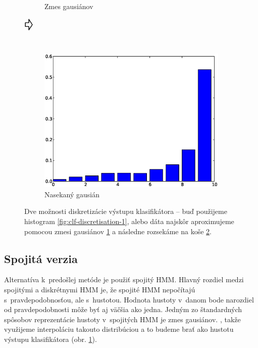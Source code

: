 \begin{figure}[htp]
\begin{subfigure}[c]{0.3\textwidth}
                \caption{Zmes gausiánov}
                \label{fig:clf-discretisation-2}
        \end{subfigure}
        $\vcenter{\hbox{\raisebox{.8cm}{\Huge\pointer}}}$
        \begin{subfigure}[c]{0.3\textwidth}
                \includegraphics[width=\textwidth]{images/hist3}
                \caption{Nasekaný gausián}
                \label{fig:clf-discretisation-3}
        \end{subfigure}
        \caption[Diskretizácia výstupu klasifikátora]{Dve možnosti diskretizácie výstupu klasifikátora -- buď použijeme histogram \ref{fig:clf-discretisation-1}, alebo dáta najskôr aproximujeme pomocou zmesi gausiánov \ref{fig:clf-discretisation-2} a následne rozsekáme na koše \ref{fig:clf-discretisation-3}.}
        \label{fig:clf-discretisation}
\end{figure}

\subsection{Spojitá verzia}

Alternatíva k~predošlej metóde je použiť spojitý HMM. Hlavný rozdiel medzi spojitými a diskrétnymi HMM je, že spojité HMM nepočítajú s~pravdepodobnosťou, ale s~hustotou. Hodnota hustoty v~danom bode narozdiel od pravdepodobnosti môže byť aj väčšia ako jedna. Jedným zo štandardných spôsobov reprezentácie hustoty v~spojitých HMM je zmes gausiánov. \cite{huang1989multiple}, takže využijeme interpoláciu takouto distribúciou a to budeme brať ako hustotu výstupu klasifikátora (obr. \ref{fig:clf-discretisation-2}).

